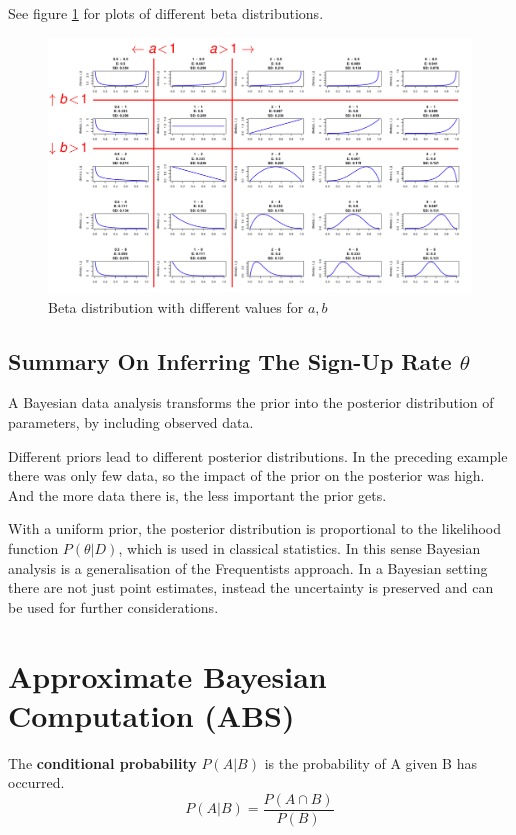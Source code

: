 \documentclass[11pt]{article}
\begin{document}
See figure \ref{fig:betadistributionparameters} for plots of different beta distributions.

\begin{figure}[tbh]
	\centering
	\includegraphics[width=\linewidth, keepaspectratio]{img/beta_distribution_parameters}
	\caption{Beta distribution with different values for $a,b$}
	\label{fig:betadistributionparameters}
\end{figure}

\subsection{Summary On Inferring The Sign-Up Rate $\theta$}

A Bayesian data analysis transforms the prior into the posterior distribution of parameters, by including observed data.

Different priors lead to different posterior distributions. In the preceding example there was only few data, so the impact of the prior on the posterior was high. And the more data there is, the less important the prior gets.

With a uniform prior, the posterior distribution is proportional to the likelihood function $P(\theta|D)$, which is used in classical statistics. In this sense Bayesian analysis is a generalisation of the Frequentists approach. In a Bayesian setting there are not just point estimates, instead the uncertainty is preserved and can be used for further considerations.

\section{Approximate Bayesian Computation (ABS)}
The \textbf{conditional probability} $P(A|B)$ is the probability of A given B has occurred.
\begin{equation*}
	P(A|B) = \frac{P(A\cap B)}{P(B)}
\end{equation*}
\end{document}
